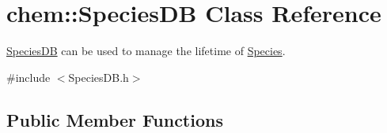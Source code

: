 \hypertarget{classchem_1_1SpeciesDB}{\section{chem\-:\-:Species\-D\-B Class Reference}
\label{classchem_1_1SpeciesDB}
}


\hyperlink{classchem_1_1SpeciesDB}{Species\-D\-B} can be used to manage the lifetime of \hyperlink{classchem_1_1Species}{Species}.  




{\ttfamily \#include $<$Species\-D\-B.\-h$>$}

\subsection*{Public Member Functions}
